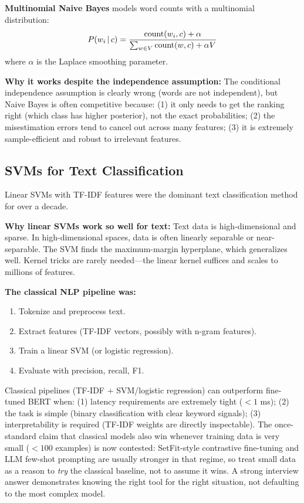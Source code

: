 \textbf{Multinomial Naive Bayes} models word counts with a multinomial distribution:
\begin{equation}
    P(w_i \,|\, c) = \frac{\text{count}(w_i, c) + \alpha}{\sum_{w \in V} \text{count}(w, c) + \alpha V}
\end{equation}
where $\alpha$ is the Laplace smoothing parameter.

\textbf{Why it works despite the independence assumption:} The conditional independence
assumption is clearly wrong (words are not independent), but Naive Bayes is often
competitive because: (1) it only needs to get the ranking right (which class has higher
posterior), not the exact probabilities; (2) the misestimation errors tend to cancel out
across many features; (3) it is extremely sample-efficient and robust to irrelevant
features.

\subsection{SVMs for Text Classification}
\label{sec:svm_text}

Linear SVMs with TF-IDF features were the dominant text classification method for over a
decade.

\textbf{Why linear SVMs work so well for text:} Text data is high-dimensional and sparse.
In high-dimensional spaces, data is often linearly separable or near-separable. The SVM
finds the maximum-margin hyperplane, which generalizes well. Kernel tricks are rarely
needed---the linear kernel suffices and scales to millions of features.

\textbf{The classical NLP pipeline was:}
\begin{enumerate}
    \item Tokenize and preprocess text.
    \item Extract features (TF-IDF vectors, possibly with n-gram features).
    \item Train a linear SVM (or logistic regression).
    \item Evaluate with precision, recall, F1.
\end{enumerate}

\begin{keyinsight}
Classical pipelines (TF-IDF + SVM/logistic regression) can outperform fine-tuned BERT when:
(1) latency requirements are extremely tight ($< 1$ ms); (2) the task is simple (binary
classification with clear keyword signals); (3) interpretability is required (TF-IDF
weights are directly inspectable). The once-standard claim that classical models also win
whenever training data is very small ($< 100$ examples) is now contested: SetFit-style
contrastive fine-tuning and LLM few-shot prompting are usually stronger in that regime, so
treat small data as a reason to \emph{try} the classical baseline, not to assume it wins. A
strong interview answer demonstrates knowing the right tool for the right situation, not
defaulting to the most complex model.
\end{keyinsight}

